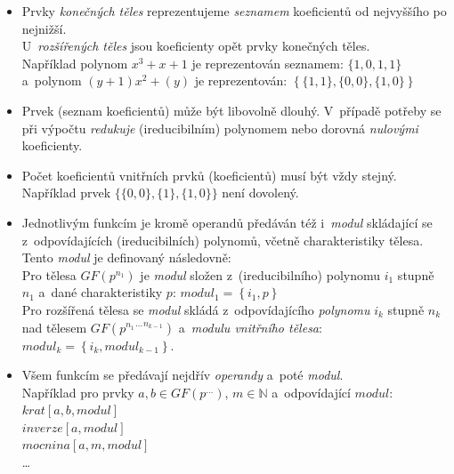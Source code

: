 \documentclass[thesis=M,czech,hidelinks]{FITthesis}[2012/06/26]
\newcommand{\0}{{\textcolor[gray]{0.75}{0}}}
\begin{document}
\begin{itemize}
    \item Prvky \emph{konečných těles} reprezentujeme \emph{seznamem}
        koeficientů od nejvyššího po nejnižší. \\
        U~\emph{rozšířených těles} jsou koeficienty opět prvky konečných těles. \\
        Například polynom $x^3+x+1$ je reprezentován seznamem: $\{1,0,1,1\}$ \\
        a~polynom $(y+1)x^2 + (y)$ je reprezentován:
        $\left\{\{1,1\},\{0,0\},\{1,0\}\right\}$

    \item Prvek (seznam koeficientů) může být libovolně dlouhý. V~případě
        potřeby se při výpočtu \emph{redukuje} (ireducibilním) polynomem nebo
        dorovná \emph{nulovými} koeficienty.

    \item Počet koeficientů vnitřních prvků (koeficientů) musí být vždy stejný. \\
        Například prvek $\{\{0,0\},\{1\},\{1,0\}\}$ není dovolený.

    \item Jednotlivým funkcím je kromě operandů předáván též i~\emph{modul}
        skládající se z~odpovídajících (ireducibilních) polynomů, včetně
        charakteristiky tělesa. Tento \emph{modul} je definovaný následovně: \\
        Pro tělesa $GF(p^{n_1})$ je \emph{modul} složen z~(ireducibilního)
        polynomu $i_1$ stupně $n_1$ a~dané charakteristiky $p$:
        $modul_1 = \left\{i_1,p\right\}$ \\
        Pro rozšířená tělesa se \emph{modul} skládá z~odpovídajícího
        \emph{polynomu} $i_k$ stupně $n_k$ nad tělesem
        $GF( {{p^{n_1}}^{\ldots}}^{n_{k-1}} )$ a~\emph{modulu vnitřního tělesa}: \\
        $modul_k = \left\{i_k,modul_{k-1}\right\}$.

    \item Všem funkcím se předávají nejdřív \emph{operandy} a~poté
        \emph{modul}.\\
        Například pro prvky $a,b\in GF(p^{\ldots})$, $m\in\mathbb{N}$
        a~odpovídající $modul$: \\
        \hspace*{0.6cm}$krat[a,b,modul]$ \\
        \hspace*{0.6cm}$inverze[a,modul]$ \\
        \hspace*{0.6cm}$mocnina[a,m,modul]$ \\
        \hspace*{0.6cm}\ldots


\end{itemize}
\end{document}

